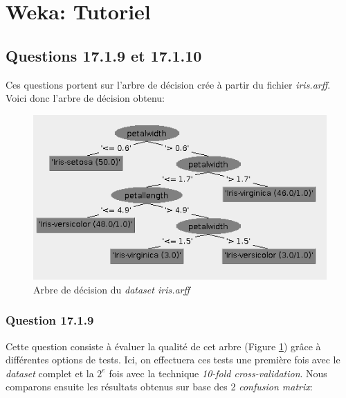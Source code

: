 \documentclass[10pt,a4paper]{article}
\begin{document}
   	
   	\section{Weka: Tutoriel}
   	
	   	\subsection{Questions 17.1.9 et 17.1.10}
		   	Ces questions portent sur l'arbre de décision crée à partir du fichier \textit{iris.arff}. Voici donc l'arbre de décision obtenu:
		   	
		   	\begin{figure}[h]
		   		\begin{center}
		   			\includegraphics[width=0.3\linewidth]{IrisTree}
		   		\end{center}
		   		\caption{Arbre de décision du \textit{dataset iris.arff}}
		   		\label{fig-Iris-tree}
		   	\end{figure}
		   	
		   	\subsubsection*{Question 17.1.9}
			   	Cette question consiste à évaluer la qualité de cet arbre (Figure \ref{fig-Iris-tree}) grâce à différentes options de tests. Ici, on effectuera ces tests une première fois avec le \textit{dataset} complet et la $2^{e}$ fois avec la technique \textit{10-fold cross-validation}. Nous comparons ensuite les résultats obtenus sur base des 2 \textit{confusion matrix}:\\
	   			
\end{document}
